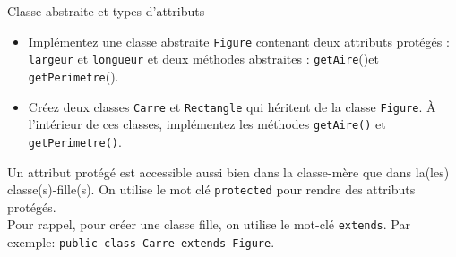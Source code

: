 	
	\begin{Exercice}[15 minutes]{Classe abstraite et types d'attributs}
	\begin{itemize}
		\item Implémentez une classe abstraite \lstinline{Figure} contenant deux attributs protégés : \lstinline{largeur} et \lstinline{longueur} et deux méthodes abstraites : \lstinline{getAire}()et \lstinline{getPerimetre}().
		\item Créez deux classes \lstinline{Carre} et \lstinline{Rectangle} qui héritent de la classe \lstinline{Figure}. À l'intérieur de ces classes, implémentez les méthodes \lstinline{getAire()} et \lstinline{getPerimetre()}.
	\end{itemize}
	
	\begin{conseil}
		Un attribut protégé est accessible aussi bien dans la classe-mère que dans la(les) classe(s)-fille(s). On utilise le mot clé \lstinline{protected} pour rendre des attributs protégés. \\
		Pour rappel, pour créer une classe fille, on utilise le mot-clé \lstinline{extends}. Par exemple: \lstinline{public class Carre extends Figure}.
	\end{conseil}
	
	
	\begin{solution}
	 
	\end{solution}
	\end{Exercice}
	\newpage

